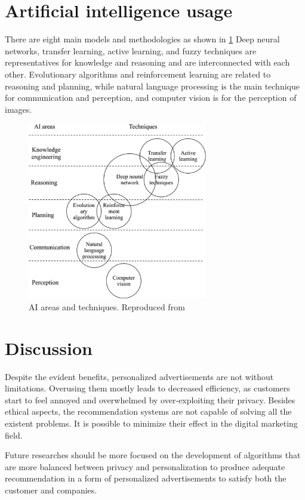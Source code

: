 \documentclass[10pt,twoside,english,a4paper]{article}
\begin{document}
\section{Artificial intelligence usage}
There are eight main models and methodologies as shown in \ref{fig:fig5} Deep neural networks, transfer learning, active learning, and fuzzy techniques are representatives for knowledge and reasoning and are interconnected with each other. Evolutionary algorithms and reinforcement learning are related to reasoning and planning, while natural language processing is the main technique for communication and perception, and computer vision is for the perception of images.
\cite{zhang2021ai_recommender}
\begin{figure}[H]
    \centering
	\includegraphics[width=0.7\textwidth]{./diagrams/ai_recommender.png}
	\caption{AI areas and techniques. Reproduced from \cite{zhang2021ai_recommender}}
	\label{fig:fig5}
\end{figure}




\section{Discussion}
Despite the evident benefits, personalized advertisements are not without limitations. Overusing them mostly leads to decreased efficiency, as customers start to feel annoyed and overwhelmed by over-exploiting their privacy.  Besides ethical aspects, the recommendation systems are not capable of solving all the existent problems. It is possible to minimize their effect in the digital marketing field. 

\medskip Future researches should be more focused on the development of algorithms that are  more balanced between privacy and personalization to produce adequate recommendation in a form of personalized advertisements to satisfy both the customer and companies. 
\end{document}
